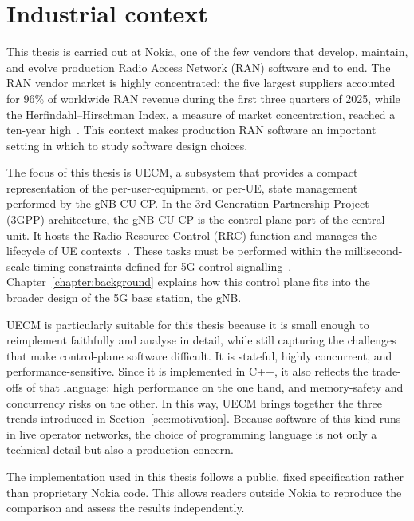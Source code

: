 \documentclass[english,oneside,a4paper,censored,csm,software-track-2020]{HYthesisML}
\begin{document}
\section{Industrial context}\label{sec:industrial}
This thesis is carried out at Nokia, one of the few vendors that develop, maintain, 
and evolve production Radio Access Network (RAN) software end to end. The RAN vendor 
market is highly concentrated: the five largest suppliers accounted for 96\% of worldwide 
RAN revenue during the first three quarters of 2025, while the Herfindahl--Hirschman Index, 
a measure of market concentration, reached a ten-year high~\cite{delloro2025ran3q,delloro2026ran}. 
This context makes production RAN software an important setting in which to study software design choices.

The focus of this thesis is UECM, a subsystem that provides a compact representation of the 
per-user-equipment, or per-UE, state management performed by the gNB-CU-CP. In the 3rd 
Generation Partnership Project (3GPP) architecture, the gNB-CU-CP is the control-plane 
part of the central unit. It hosts the Radio Resource Control (RRC) function and manages 
the lifecycle of UE contexts~\cite{3gpp38401,3gpp38331}. These tasks must be performed 
within the millisecond-scale timing constraints defined for 5G control signalling~\cite{3gpp38913}.
Chapter~\ref{chapter:background} explains how this control plane fits into the broader 
design of the 5G base station, the gNB.

UECM is particularly suitable for this thesis because it is small enough to reimplement 
faithfully and analyse in detail, while still capturing the challenges that make control-plane 
software difficult. It is stateful, highly concurrent, and performance-sensitive. Since it is 
implemented in C++, it also reflects the trade-offs of that language: high performance on the 
one hand, and memory-safety and concurrency risks on the other. In this way, UECM brings together 
the three trends introduced in Section~\ref{sec:motivation}. Because software of this kind runs in 
live operator networks, the choice of programming language is not only a technical detail but also a 
production concern.

The implementation used in this thesis follows a public, fixed specification rather than 
proprietary Nokia code. This allows readers outside Nokia to reproduce the comparison and 
assess the results independently.
\end{document}

